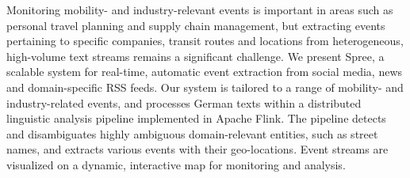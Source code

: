 Monitoring mobility- and industry-relevant events is important in areas such as personal travel planning and supply chain management, but extracting events pertaining to specific companies, transit routes and locations from heterogeneous, high-volume text streams remains a significant challenge. We present Spree, a scalable system for real-time, automatic event extraction from social media, news and domain-specific RSS feeds. Our system is tailored to a range of mobility- and industry-related events, and processes German texts within a distributed linguistic analysis pipeline implemented in Apache Flink. The pipeline detects and disambiguates highly ambiguous domain-relevant entities, such as street names, and extracts various events with their geo-locations. Event streams are visualized on a dynamic, interactive map for monitoring and analysis.
